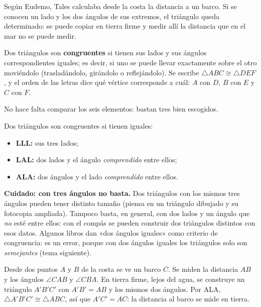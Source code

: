 \documentclass[11pt]{article}
\begin{document}
\label{tema:congruencia}

\begin{hilo}
Según Eudemo, Tales calculaba desde la costa la distancia a un barco. Si se
conocen un lado y los dos ángulos de sus extremos, el triángulo queda
determinado: se puede copiar en tierra firme y medir allí la distancia que
en el mar no se puede medir.
\end{hilo}

\begin{definicion}
Dos triángulos son \textbf{congruentes} si tienen sus lados y sus ángulos
correspondientes iguales; es decir, si uno se puede llevar exactamente sobre
el otro moviéndolo (trasladándolo, girándolo o reflejándolo). Se escribe
$\triangle ABC \cong \triangle DEF$, y el orden de las letras dice qué
vértice corresponde a cuál: $A$ con $D$, $B$ con $E$ y $C$ con $F$.
\end{definicion}

No hace falta comparar los seis elementos: bastan tres bien escogidos.

\begin{teorema}
Dos triángulos son congruentes si tienen iguales:
\begin{itemize}
  \item \textbf{LLL:} sus tres lados;
  \item \textbf{LAL:} dos lados y el ángulo \emph{comprendido} entre ellos;
  \item \textbf{ALA:} dos ángulos y el lado \emph{comprendido} entre ellos.
\end{itemize}
\end{teorema}

\textbf{Cuidado: con tres ángulos no basta.} Dos triángulos con los mismos
tres ángulos pueden tener distinto tamaño (piensa en un triángulo dibujado
y su fotocopia ampliada). Tampoco basta, en general, con dos lados y un
ángulo que \emph{no} esté entre ellos: con el compás se pueden construir
dos triángulos distintos con esos datos. Algunos libros dan «dos ángulos
iguales» como criterio de congruencia: es un error, porque con dos ángulos
iguales los triángulos solo son \emph{semejantes} (tema siguiente).

\begin{ejemplo}
Desde dos puntos $A$ y $B$ de la costa se ve un barco $C$. Se miden la
distancia $AB$ y los ángulos $\angle CAB$ y $\angle CBA$. En tierra firme,
lejos del agua, se construye un triángulo $A'B'C'$ con $A'B' = AB$ y los
mismos dos ángulos. Por ALA, $\triangle A'B'C' \cong \triangle ABC$, así
que $A'C' = AC$: la distancia al barco se mide en tierra.
\end{ejemplo}
\end{document}
